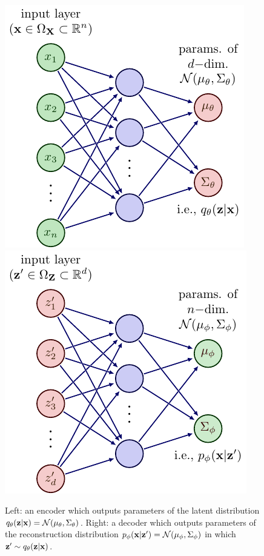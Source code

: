 \documentclass[11pt]{article}
\begin{document}
\begin{figure}
    \centering
    \includegraphics[width=0.46\linewidth]{figures/generative_models/VAE_encoder.pdf}
    \hspace{20pt}
    \includegraphics[width=0.46\linewidth]{figures/generative_models/VAE_decoder.pdf}
    \caption{Left: an encoder which outputs parameters of the latent distribution $q_{\theta}(\mathbf{z}|\mathbf{x})=\mathcal{N}(\mu_{\theta},\Sigma_{\theta})$. Right: a decoder which outputs parameters of the reconstruction distribution $p_{\phi}(\mathbf{x}|\mathbf{z}')=\mathcal{N}(\mu_{\phi},\Sigma_{\phi})$ in which $\mathbf{z}'\sim q_{\theta}(\mathbf{z}|\mathbf{x})$.}
    \label{fig:VAE_architecture}
\end{figure}
\end{document}
